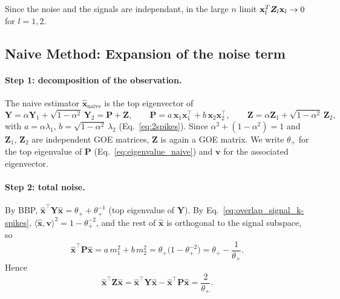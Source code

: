 Since the noise and the signals are independant, in the large $n$ limit $\boldsymbol{\mathbf{x}}_l^T \bm{Z}_l \boldsymbol{\mathbf{x}}_l \rightarrow 0$ for $l=1,2$.
\subsection{Naive Method: Expansion of the noise term}\label{an:Naive-Loss}

\paragraph{Step 1: decomposition of the observation.}
The naive estimator $\hat{\boldsymbol{x}}_{\mathrm{naive}}$ is the top eigenvector of
\begin{equation}
  \mathbf{Y} = \alpha\mathbf{Y}_1 + \sqrt{1-\alpha^2}\,\mathbf{Y}_2 = \mathbf{P} + \mathbf{Z},
  \qquad
  \mathbf{P} = a\,\boldsymbol{x}_1\boldsymbol{x}_1^\top + b\,\boldsymbol{x}_2\boldsymbol{x}_2^\top,
  \qquad
  \mathbf{Z} = \alpha\mathbf{Z}_1 + \sqrt{1-\alpha^2}\,\mathbf{Z}_2,
\end{equation}
with $a = \alpha\lambda_1$, $b = \sqrt{1-\alpha^2}\,\lambda_2$ (Eq.~\eqref{eq:2spikes}). Since $\alpha^2 + (1-\alpha^2) = 1$ and
$\mathbf{Z}_1$, $\mathbf{Z}_2$ are independent GOE matrices, $\mathbf{Z}$ is again a GOE matrix.
We write $\theta_+$ for the top eigenvalue of $\mathbf{P}$ (Eq.~\eqref{eq:eigenvalue_naive}) and $\boldsymbol{v}$ for the associated eigenvector.

\paragraph{Step 2: total noise.}
By BBP, $\hat{\boldsymbol{x}}^\top\mathbf{Y}\hat{\boldsymbol{x}} = \theta_+ + \theta_+^{-1}$ (top eigenvalue of $\mathbf{Y}$).
By Eq.~\eqref{eq:overlap_signal_k-spikes}, $\langle\hat{\boldsymbol{x}},\boldsymbol{v}\rangle^2 = 1-\theta_+^{-2}$, and the rest of $\hat{\boldsymbol{x}}$ is orthogonal to the
signal subspace, so
\begin{equation}
  \hat{\boldsymbol{x}}^\top\mathbf{P}\hat{\boldsymbol{x}} = a\, m_1^2 + b\, m_2^2 = \theta_+\big(1-\theta_+^{-2}\big) = \theta_+ - \frac{1}{\theta_+} .
  \label{eq:naive_T}
\end{equation}
Hence
\begin{equation}
  \hat{\boldsymbol{x}}^\top\mathbf{Z}\hat{\boldsymbol{x}}
  = \hat{\boldsymbol{x}}^\top\mathbf{Y}\hat{\boldsymbol{x}} - \hat{\boldsymbol{x}}^\top\mathbf{P}\hat{\boldsymbol{x}}
  = \frac{2}{\theta_+} .
\end{equation}

